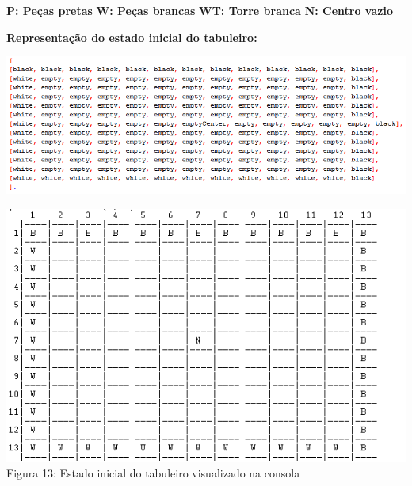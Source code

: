\documentclass[a4paper]{article}
\begin{document}
\begin{center}

\textbf{P: Peças pretas} \linebreak\linebreak
\textbf{W: Peças brancas} \linebreak\linebreak
\textbf{WT: Torre branca} \linebreak\linebreak
\textbf{N: Centro vazio} \linebreak\linebreak

\end{center}
\textbf{Representação do estado inicial do tabuleiro:}
\begin{center}
\hspace*{-2cm}\includegraphics[scale=0.85]{gameex1rep.png}\linebreak\linebreak

    \includegraphics[scale=0.9]{gameex1.png}\linebreak
Figura 13: Estado inicial do tabuleiro visualizado na consola \linebreak\linebreak\linebreak

\end{center}
\end{document}

